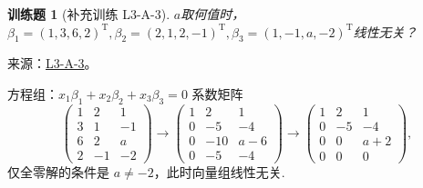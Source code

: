 \documentclass[UTF8,12pt,a4paper,fontset=fandol]{ctexart}
\newtheorem{exercise}{训练题}[section]
\begin{document}
\begin{exercise}[补充训练 L3-A-3]\label{prob:L3-A-3}
$a$取何值时，$\beta_1=(1,3,6,2)^\mathrm{T},\beta_2=(2,1,2,-1)^\mathrm{T},\beta_3=(1,-1,a,-2)^\mathrm{T}$线性无关？
\end{exercise}
\noindent 来源：\href{https://github.com/yhwu-is/Linear-Algebra-Left-Undone/blob/new/%E8%AE%B2%E4%B9%89/%E4%B8%93%E9%A2%98/3%20%E6%9C%89%E9%99%90%E7%BB%B4%E7%BA%BF%E6%80%A7%E7%A9%BA%E9%97%B4.tex}{L3-A-3}。
\begin{solve}
方程组：$x_1\beta_1+x_2\beta_2+x_3\beta_3=0$ 系数矩阵
            \[\begin{pmatrix}
                    1 & 2  & 1  \\
                    3 & 1  & -1 \\
                    6 & 2  & a  \\
                    2 & -1 &
                    -2\end{pmatrix}\rightarrow\begin{pmatrix}
                    1 & 2   & 1   \\
                    0 & -5  & -4  \\
                    0 & -10 & a-6 \\
                    0 & -5  & -4
                \end{pmatrix}\rightarrow\begin{pmatrix}
                    1 & 2  & 1   \\
                    0 & -5 & -4  \\
                    0 & 0  & a+2 \\
                    0 & 0  & 0
                \end{pmatrix},\]
            仅全零解的条件是 $a\neq-2$，此时向量组线性无关.
\end{solve}
\end{document}
